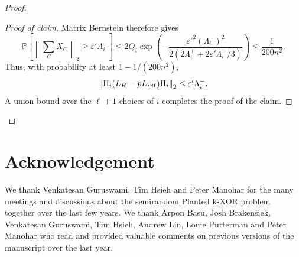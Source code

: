 \documentclass
[11pt,letterpaper]
{article}
\renewcommand{\Pr}{\mathbb P}
\renewcommand{\epsilon}{\varepsilon}
\begin{document}
\begin{proof}
\begin{proof}[Proof of claim]
Matrix Bernstein therefore gives
\[
\Pr\left[\left\|\sum_C X_C\right\|_2\geq \epsilon'\Lambda_i^-\right]
\leq
2Q_i\exp\left(-\frac{\epsilon'^2(\Lambda_i^-)^2}{2(2\Lambda_i^+ + 2\epsilon'\Lambda_i^-/3)}\right)
\leq \frac{1}{200n^2}.
\]
Thus, with probability at least $1-1/(200n^2)$,
\[
\left\|\Pi_i(L_H-pL_{\Hf})\Pi_i\right\|_2\leq \epsilon'\Lambda_i^-.
\]
A union bound over the $\ell+1$ choices of $i$ completes the proof of the claim. \end{proof} \end{proof}




\section*{Acknowledgement}
We thank Venkatesan Guruswami, Tim Hsieh and Peter Manohar for the many meetings and discussions about the semirandom Planted k-XOR problem together over the last few years. We thank Arpon Basu, Josh Brakensiek, Venkatesan Guruswami, Tim Hsieh, Andrew Lin, Louie Putterman and Peter Manohar who read and provided valuable comments on previous versions of the manuscript over the last year.  




\appendix
\end{document}
